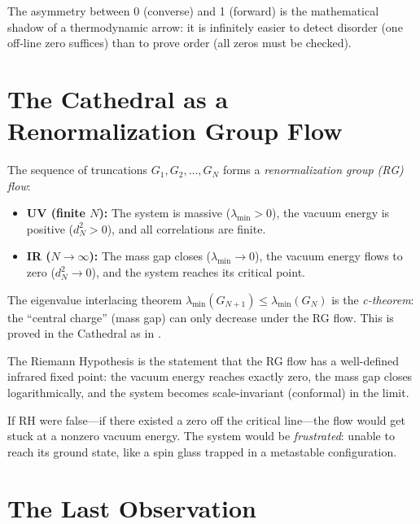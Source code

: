\documentclass[11pt,a4paper]{article}
\begin{document}
The asymmetry between 0 (converse) and 1 (forward) is the
mathematical shadow of a thermodynamic arrow: it is infinitely
easier to detect disorder (one off-line zero suffices) than to
prove order (all zeros must be checked).

\section{The Cathedral as a Renormalization Group Flow}

The sequence of truncations $G_1, G_2, \ldots, G_N$ forms a
\emph{renormalization group (RG) flow}:

\begin{itemize}
  \item \textbf{UV (finite $N$):} The system is massive
    ($\lambda_{\min} > 0$), the vacuum energy is positive
    ($d_N^2 > 0$), and all correlations are finite.
  \item \textbf{IR ($N \to \infty$):} The mass gap closes
    ($\lambda_{\min} \to 0$), the vacuum energy flows to zero
    ($d_N^2 \to 0$), and the system reaches its critical point.
\end{itemize}

The eigenvalue interlacing theorem
$\lambda_{\min}(G_{N+1}) \leq \lambda_{\min}(G_N)$ is the
\emph{c-theorem}: the ``central charge'' (mass gap) can only
decrease under the RG flow. This is proved in the Cathedral
as  in
.

\begin{correspondence}
The Riemann Hypothesis is the statement that the RG flow has a
well-defined infrared fixed point: the vacuum energy reaches
exactly zero, the mass gap closes logarithmically, and the
system becomes scale-invariant (conformal) in the limit.

If RH were false---if there existed a zero off the critical line---the
flow would get stuck at a nonzero vacuum energy. The system would
be \emph{frustrated}: unable to reach its ground state, like a
spin glass trapped in a metastable configuration.
\end{correspondence}

\section{The Last Observation}
\end{document}
